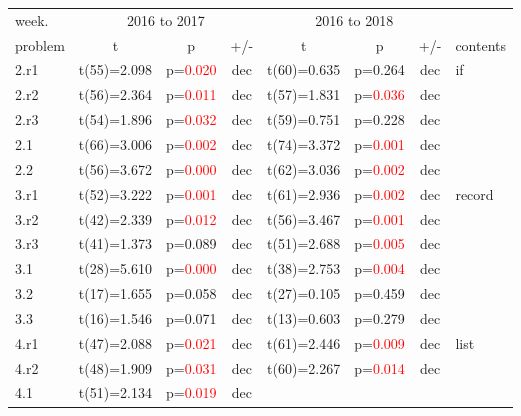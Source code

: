 \begin{table}
\begin{center}  
\small
  \begin{tabular}{|l||c|c|c||c|c|c||l|}
    \hline
    week.
    & \multicolumn{3}{|c||}{2016 to 2017}
    & \multicolumn{3}{|c||}{2016 to 2018}
    &
    \\ \cline{2-7}
    problem & t & p & +/- & t & p & +/- & contents
    \\ \hline
    2.r1
    & t(55)=2.098 & p=\textcolor{red}{0.020} & dec
    & t(60)=0.635 & p=0.264 & dec
    & if\\ \cline{1-7}
    2.r2
    & t(56)=2.364 & p=\textcolor{red}{0.011} & dec
    & t(57)=1.831 & p=\textcolor{red}{0.036} & dec
    & \\ \cline{1-7}
    2.r3
    & t(54)=1.896 & p=\textcolor{red}{0.032} & dec
    & t(59)=0.751 & p=0.228 & dec
    & \\ \cline{1-7}
    2.1
    & t(66)=3.006 & p=\textcolor{red}{0.002} & dec
    & t(74)=3.372 & p=\textcolor{red}{0.001} & dec
    & \\ \cline{1-7}
    2.2
    & t(56)=3.672 & p=\textcolor{red}{0.000} & dec
    & t(62)=3.036 & p=\textcolor{red}{0.002} & dec
    & \\ \hline
    3.r1
    & t(52)=3.222 & p=\textcolor{red}{0.001} & dec
    & t(61)=2.936 & p=\textcolor{red}{0.002} & dec
    & record\\ \cline{1-7}
    3.r2
    & t(42)=2.339 & p=\textcolor{red}{0.012} & dec
    & t(56)=3.467 & p=\textcolor{red}{0.001} & dec
    & \\ \cline{1-7}
    3.r3
    & t(41)=1.373 & p=0.089 & dec
    & t(51)=2.688 & p=\textcolor{red}{0.005} & dec
    & \\ \cline{1-7}
    3.1
    & t(28)=5.610 & p=\textcolor{red}{0.000} & dec
    & t(38)=2.753 & p=\textcolor{red}{0.004} & dec
    & \\ \cline{1-7}
    3.2
    & t(17)=1.655 & p=0.058 & dec
    & t(27)=0.105 & p=0.459 & dec
    & \\ \cline{1-7}
    3.3
    & t(16)=1.546 & p=0.071 & dec
    & t(13)=0.603 & p=0.279 & dec
    & \\ \hline
    4.r1
    & t(47)=2.088 & p=\textcolor{red}{0.021} & dec
    & t(61)=2.446 & p=\textcolor{red}{0.009} & dec
    & list\\ \cline{1-7}
    4.r2
    & t(48)=1.909 & p=\textcolor{red}{0.031} & dec
    & t(60)=2.267 & p=\textcolor{red}{0.014} & dec
    & \\ \cline{1-7}
    4.1
    & t(51)=2.134 & p=\textcolor{red}{0.019} & dec

\end{tabular}
\end{center}
\end{table}
